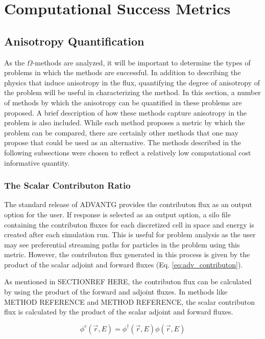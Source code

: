 \section{Computational Success Metrics}
\label{sec:successmetrics}
\subsection{Anisotropy Quantification}
\label{sec:anisotropy_quant}

As the $\Omega$-methods are analyzed, it will be important to determine the
types of problems in which the methods are successful. In addition to describing
the physics that induce anisotropy in the flux, quantifying the degree of
anisotropy of the problem will be useful in characterizing the method. In this
section, a number
of methods by which the anisotropy can be quantified in these problems are
proposed. A brief description of how these methods capture anisotropy in the
problem is also included. While each method proposes a metric by which the
problem can be compared, there are certainly other methods that one may propose
that could be used as an alternative. The methods described in the following
subsections were chosen to reflect a relatively low computational cost
informative quantity.

\subsubsection{The Scalar Contributon Ratio}

The standard release of ADVANTG provides the contributon flux as an output
option for the user. If response is selected as an output option, a silo file containing
the contributon fluxes for each discretized cell in space and energy  is
created after
each simulation run. This is useful for problem analysis as the user may see
preferential streaming paths for particles in the problem using this metric.
However, the contributon flux generated in this process is given by the product
of the scalar adjoint and forward fluxes (Eq. \eqref{eq:adv_contributon}).

As mentioned in SECTIONREF HERE, the contributon flux can be calculated by using
the product of the forward and adjoint fluxes. In methods like METHOD REFERENCE
and METHOD REFERENCE, the scalar contributon flux is calculated by the product
of the scalar adjoint and forward fluxes.

\begin{equation}
  \phi^{c}(\vec {r} ,E)  = \phi^{\dagger}(\vec {r} ,E)\phi(\vec {r} ,E)
\label{eq:adv_contributon}
\end{equation}

